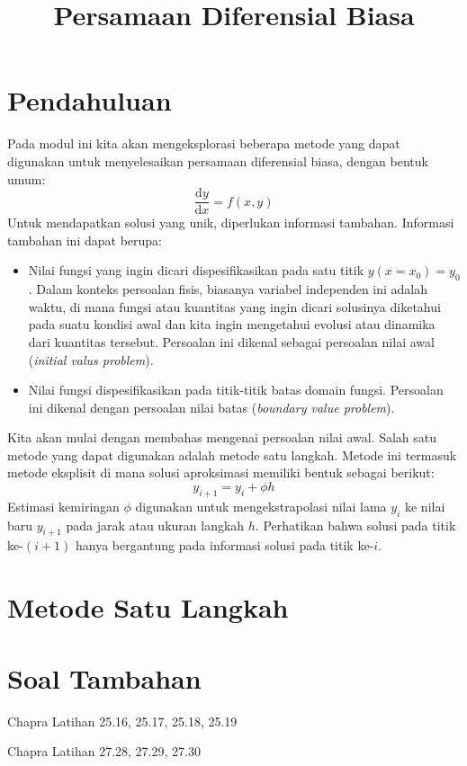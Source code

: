 



\title{Persamaan Diferensial Biasa}
\author{}
\date{}
\maketitle


%

\section*{Pendahuluan}
Pada modul ini kita akan mengeksplorasi beberapa metode yang
dapat digunakan untuk menyelesaikan persamaan diferensial biasa, dengan bentuk umum:
\begin{equation}
\frac{\mathrm{d}y}{\mathrm{d}x} = f(x,y)
\label{eq:dydx_umum}
\end{equation}
Untuk mendapatkan solusi yang unik, diperlukan informasi tambahan.
Informasi tambahan ini dapat berupa:
\begin{itemize}
\item Nilai fungsi yang ingin dicari dispesifikasikan pada satu titik $y(x=x_0)=y_0$.
Dalam konteks persoalan fisis, biasanya variabel independen ini adalah waktu, di mana
fungsi atau kuantitas yang ingin dicari solusinya diketahui pada suatu kondisi awal
dan kita ingin mengetahui evolusi atau dinamika dari kuantitas tersebut. Persoalan
ini dikenal sebagai persoalan nilai awal (\textit{initial valus problem}).
\item Nilai fungsi dispesifikasikan pada titik-titik batas domain fungsi.
Persoalan ini dikenal dengan persoalan nilai batas (\textit{boundary value problem}).
\end{itemize}

Kita akan mulai dengan membahas mengenai persoalan nilai awal. Salah satu metode yang
dapat digunakan adalah metode satu langkah. Metode ini termasuk metode eksplisit
di mana solusi aproksimasi memiliki bentuk sebagai berikut:
\begin{equation*}
y_{i+1} = y_{i} + \phi h
\end{equation*}
Estimasi kemiringan $\phi$ digunakan untuk mengekstrapolasi nilai lama
$y_{i}$ ke nilai baru $y_{i+1}$ pada jarak atau ukuran langkah $h$.
Perhatikan bahwa solusi pada titik ke-$(i+1)$ hanya bergantung pada informasi solusi
pada titik ke-$i$.


\section{Metode Satu Langkah}











\section{Soal Tambahan}

Chapra Latihan 25.16, 25.17, 25.18, 25.19

Chapra Latihan 27.28, 27.29, 27.30


